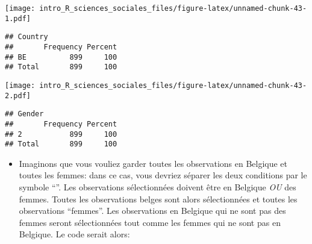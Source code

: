 \documentclass[
]{book}
\newenvironment{Shaded}{\begin{snugshade}}{\end{snugshade}}
\newcommand{\CommentTok}[1]{\textcolor[rgb]{0.56,0.35,0.01}{\textit{#1}}}
\newcommand{\DecValTok}[1]{\textcolor[rgb]{0.00,0.00,0.81}{#1}}
\newcommand{\FunctionTok}[1]{\textcolor[rgb]{0.00,0.00,0.00}{#1}}
\newcommand{\NormalTok}[1]{#1}
\newcommand{\OtherTok}[1]{\textcolor[rgb]{0.56,0.35,0.01}{#1}}
\newcommand{\SpecialCharTok}[1]{\textcolor[rgb]{0.00,0.00,0.00}{#1}}
\newcommand{\StringTok}[1]{\textcolor[rgb]{0.31,0.60,0.02}{#1}}
\providecommand{\tightlist}{%
  \setlength{\itemsep}{0pt}\setlength{\parskip}{0pt}}
\begin{document}
\begin{Shaded}
\end{Shaded}

\texttt{[image: intro\_R\_sciences\_sociales\_files/figure-latex/unnamed-chunk-43-1.pdf]}

\begin{verbatim}
## Country 
##       Frequency Percent
## BE          899     100
## Total       899     100
\end{verbatim}

\begin{Shaded}
\end{Shaded}

\texttt{[image: intro\_R\_sciences\_sociales\_files/figure-latex/unnamed-chunk-43-2.pdf]}

\begin{verbatim}
## Gender 
##       Frequency Percent
## 2           899     100
## Total       899     100
\end{verbatim}

\begin{itemize}
\tightlist
\item
  Imaginons que vous vouliez garder toutes les observations en Belgique et toutes les femmes: dans ce cas, vous devriez séparer les deux conditions par le symbole ``\textbar{}''. Les observations sélectionnées doivent être en Belgique \emph{OU} des femmes. Toutes les observations belges sont alors sélectionnées et toutes les observations ``femmes''. Les observations en Belgique qui ne sont pas des femmes seront sélectionnées tout comme les femmes qui ne sont pas en Belgique. Le code serait alors:
\end{itemize}

\begin{Shaded}
\end{Shaded}
\end{document}
